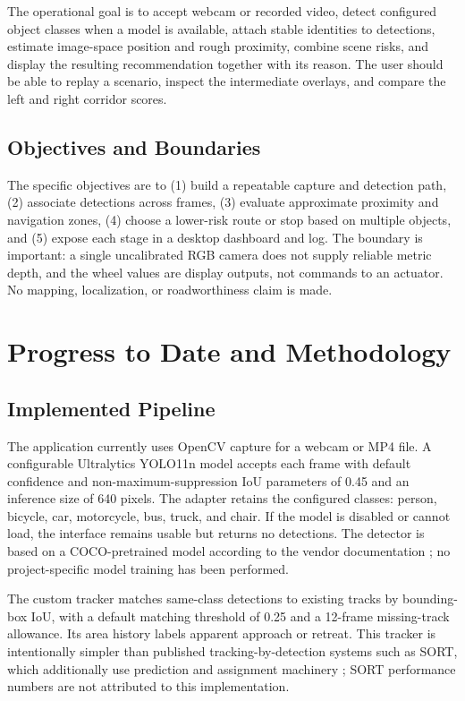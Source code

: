 \documentclass[conference,10pt]{IEEEtran}
\begin{document}
The operational goal is to accept webcam or recorded video, detect configured object classes when a model is available, attach stable identities to detections, estimate image-space position and rough proximity, combine scene risks, and display the resulting recommendation together with its reason. The user should be able to replay a scenario, inspect the intermediate overlays, and compare the left and right corridor scores.

\subsection{Objectives and Boundaries}
The specific objectives are to (1) build a repeatable capture and detection path, (2) associate detections across frames, (3) evaluate approximate proximity and navigation zones, (4) choose a lower-risk route or stop based on multiple objects, and (5) expose each stage in a desktop dashboard and log. The boundary is important: a single uncalibrated RGB camera does not supply reliable metric depth, and the wheel values are display outputs, not commands to an actuator. No mapping, localization, or roadworthiness claim is made.

\section{Progress to Date and Methodology}
\subsection{Implemented Pipeline}
The application currently uses OpenCV capture for a webcam or MP4 file. A configurable Ultralytics YOLO11n model \cite{yolo11} accepts each frame with default confidence and non-maximum-suppression IoU parameters of 0.45 and an inference size of 640 pixels. The adapter retains the configured classes: person, bicycle, car, motorcycle, bus, truck, and chair. If the model is disabled or cannot load, the interface remains usable but returns no detections. The detector is based on a COCO-pretrained model according to the vendor documentation \cite{yolo11}; no project-specific model training has been performed.

The custom tracker matches same-class detections to existing tracks by bounding-box IoU, with a default matching threshold of 0.25 and a 12-frame missing-track allowance. Its area history labels apparent approach or retreat. This tracker is intentionally simpler than published tracking-by-detection systems such as SORT, which additionally use prediction and assignment machinery \cite{sort}; SORT performance numbers are not attributed to this implementation.
\end{document}

